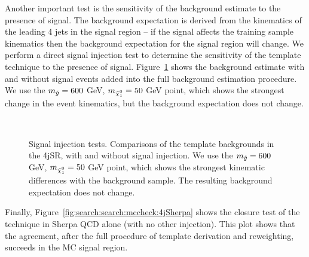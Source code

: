 Another important test is the sensitivity of the background estimate to the presence of signal. The background expectation is derived from the kinematics of the leading 4 jets in the signal region -- if the signal affects the training sample kinematics then the background expectation for the signal region will change. We perform a direct signal injection test to determine the sensitivity of the template technique to the presence of signal. Figure~\ref{fig:search:search:mccheck:4jSignalInjection} shows the \Sherpa background estimate with and without signal events added into the full background estimation procedure. We use the $m_{\tilde{g}} = 600$ GeV, $\mninoone = 50$ GeV point, which shows the strongest change in the event kinematics, but the background expectation does not change.

\begin{figure}[!ht]
  \centering
  
  \\
    
  \caption{Signal injection tests. Comparisons of the template backgrounds in the 4jSR, with and without signal injection. We use the $m_{\tilde{g}} = 600$ GeV, $\mninoone = 50$ GeV point, which shows the strongest kinematic differences with the background sample. The resulting background expectation does not change.}
               
  \label{fig:search:search:mccheck:4jSignalInjection}
\end{figure}

Finally, Figure~\ref{fig:search:search:mccheck:4jSherpa} shows the closure test of the technique in Sherpa QCD alone (with no other injection). This plot shows that the agreement, after the full procedure of template derivation and reweighting, succeeds in the MC signal region. 

